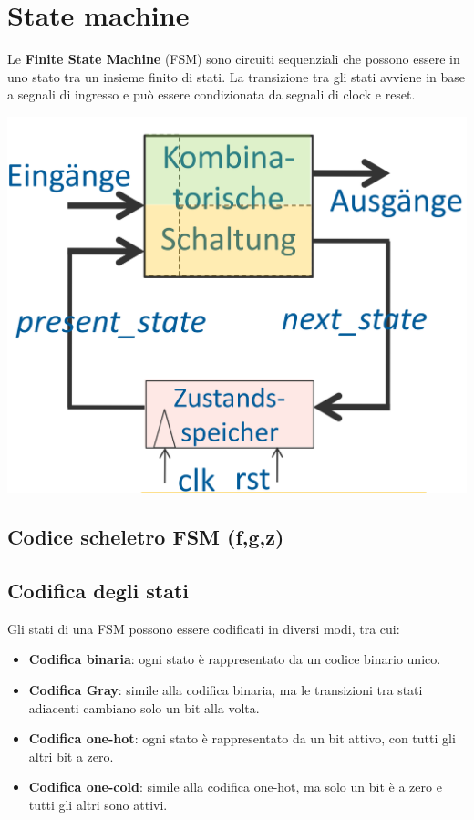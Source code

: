 \section{State machine}
    Le \textbf{Finite State Machine} (FSM) sono circuiti sequenziali che possono essere in uno stato tra un insieme finito di stati. 
    La transizione tra gli stati avviene in base a segnali di ingresso e può essere condizionata da segnali di clock e reset.

    \begin{minipage}[t]{1\columnwidth}
        \vspace{0pt} %
        \includegraphics[width=\linewidth]{Images/FSMGeneralizzata.png}
    \end{minipage}%
    

    \subsection{Codice scheletro FSM (f,g,z)}


    \subsection{Codifica degli stati}
    Gli stati di una FSM possono essere codificati in diversi modi, tra cui:
    \begin{itemize}
        \item \textbf{Codifica binaria}: ogni stato è rappresentato da un codice binario unico.
        \item \textbf{Codifica Gray}: simile alla codifica binaria, ma le transizioni tra stati adiacenti cambiano solo un bit alla volta.
        \item \textbf{Codifica one-hot}: ogni stato è rappresentato da un bit attivo, con tutti gli altri bit a zero.
        \item \textbf{Codifica one-cold}: simile alla codifica one-hot, ma solo un bit è a zero e tutti gli altri sono attivi.
    \end{itemize}
